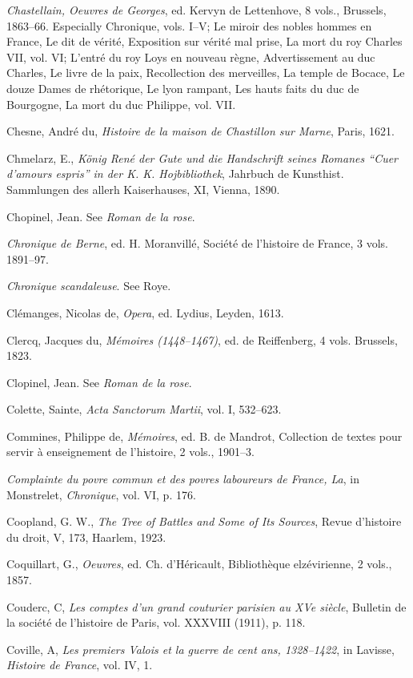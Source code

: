 \emph{Chastellain, Oeuvres de Georges}, ed. Kervyn de Lettenhove, 8
vols., Brussels, 1863--66. Especially Chronique, vols. I--V; Le miroir
des nobles hommes en France, Le dit de vérité, Exposition sur vérité mal
prise, La mort du roy Charles VII, vol. VI; L'entré du roy Loys en
nouveau règne, Advertissement au duc Charles, Le livre de la paix,
Recollection des merveilles, La temple de Bocace, Le douze Dames de
rhétorique, Le lyon rampant, Les hauts faits du duc de Bourgogne, La
mort du duc Philippe, vol. VII.

Chesne, André du, \emph{Histoire de la maison de Chastillon sur Marne},
Paris, 1621.

Chmelarz, E., \emph{König René der Gute und die Handschrift seines
Romanes ``Cuer d'amours espris'' in der K. K. Hojbibliothek}, Jahrbuch
de Kunsthist. Sammlungen des allerh Kaiserhauses, XI, Vienna, 1890.

Chopinel, Jean. See \emph{Roman de la rose}.

\emph{Chronique de Berne}, ed. H. Moranvillé, Société de l'histoire de
France, 3 vols. 1891--97.

\emph{Chronique scandaleuse}. See Roye.

Clémanges, Nicolas de, \emph{Opera}, ed. Lydius, Leyden, 1613.

Clercq, Jacques du, \emph{Mémoires (1448--1467)}, ed. de Reiffenberg, 4
vols. Brussels, 1823.

Clopinel, Jean. See \emph{Roman de la rose}.

Colette, Sainte, \emph{Acta Sanctorum Martii}, vol. I, 532--623.

Commines, Philippe de, \emph{Mémoires}, ed. B. de Mandrot, Collection de
textes pour servir à enseignement de l'histoire, 2 vols., 1901--3.

\emph{Complainte du povre commun et des povres laboureurs de France,
La}, in Monstrelet, \emph{Chronique}, vol. VI, p. 176.

\protect\hypertarget{24_BIBLIOGRAPHY.xhtmlux5cux23page_443}{}{}Coopland,
G. W., \emph{The Tree of Battles and Some of Its Sources}, Revue
d'histoire du droit, V, 173, Haarlem, 1923.

Coquillart, G., \emph{Oeuvres}, ed. Ch. d'Héricault, Bibliothèque
elzévirienne, 2 vols., 1857.

Couderc, C, \emph{Les comptes d'un grand couturier parisien au XVe
siècle}, Bulletin de la société de l'histoire de Paris, vol. XXXVIII
(1911), p. 118.

Coville, A, \emph{Les premiers Valois et la guerre de cent ans,
1328--1422}, in Lavisse, \emph{Histoire de France}, vol. IV, 1.

